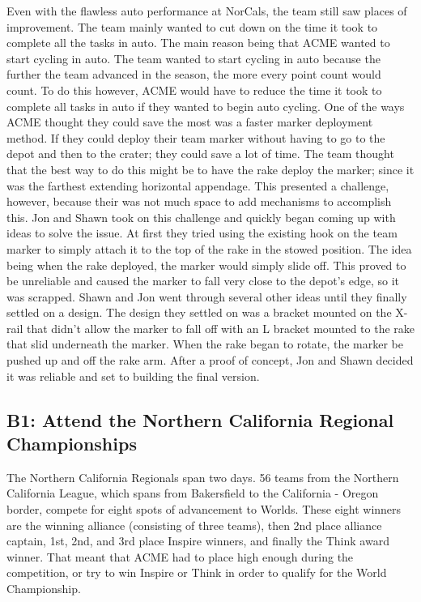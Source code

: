 \documentclass{article}
\begin{document}
Even with the flawless auto performance at NorCals, the team still saw places of improvement. The team mainly wanted to cut down on the time it took to complete all the tasks in auto. The main reason being that ACME wanted to start cycling in auto. The team wanted to start cycling in auto because the further the team advanced in the season, the more every point count would count. To do this however, ACME would have to reduce the time it took to complete all tasks in auto if they wanted to begin auto cycling. One of the ways ACME thought they could save the most was a faster marker deployment method. If they could deploy their team marker without having to go to the depot and then to the crater; they could save a lot of time. The team thought that the best way to do this might be to have the rake deploy the marker; since it was the farthest extending horizontal appendage. This presented a challenge, however, because their was not much space to add mechanisms to accomplish this. Jon and Shawn took on this challenge and quickly began coming up with ideas to solve the issue. At first they tried using the existing hook on the team marker to simply attach it to the top of the rake in the stowed position. The idea being when the rake deployed, the marker would simply slide off. This proved to be unreliable and caused the marker to fall very close to the depot's edge, so it was scrapped. Shawn and Jon went through several other ideas until they finally settled on a design. The design they settled on was a bracket mounted on the X-rail that didn't allow the marker to fall off with an L bracket mounted to the rake that slid underneath the marker. When the rake began to rotate, the marker be pushed up and off the rake arm. After a proof of concept, Jon and Shawn decided it was reliable and set to building the final version.
\subsection{B1: Attend the Northern California Regional Championships}

The Northern California Regionals span two days. 56 teams from the Northern California League, which spans from Bakersfield to the California - Oregon border, compete for eight spots of advancement to Worlds. These eight winners are the winning alliance (consisting of three teams), then 2nd place alliance captain, 1st, 2nd, and 3rd place Inspire winners, and finally the Think award winner. That meant that ACME had to place high enough during the competition, or try to win Inspire or Think in order to qualify for the World Championship. \\
\end{document}
